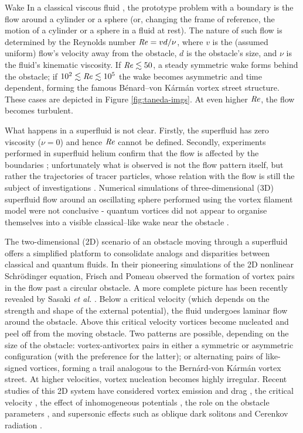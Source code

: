 \begin{chapter}{\label{cha:wake}Wake}
In a classical viscous fluid \cite{Frisch}, the prototype problem with
a boundary is the flow 
around a cylinder or a sphere (or, changing the frame of reference, 
the motion of a cylinder or a sphere in a fluid at rest).
The nature of such flow is determined by the Reynolds 
number $\mbox{\ensuremath{\mathit{Re}}} = vd/\nu$, where $v$ is the (assumed uniform)
flow's velocity away from the obstacle, $d$ is the obstacle's size,
and $\nu$ is the fluid's
kinematic viscosity. If $\mbox{\ensuremath{\mathit{Re}}}\lesssim50$, a steady symmetric 
wake forms behind the obstacle; if $10^2\lesssim\mbox{\ensuremath{\mathit{Re}}}\lesssim10^5$ the wake 
becomes asymmetric and time dependent, forming the famous 
B\'enard--von K\'arm\'an vortex street structure.  These cases are depicted in Figure \ref{fig:taneda-imgs}.  At even higher $\mbox{\ensuremath{\mathit{Re}}}$,
the flow becomes turbulent. 

What happens in a superfluid is not clear. Firstly, the superfluid has
zero viscosity ($\nu=0$) and hence $\mbox{\ensuremath{\mathit{Re}}}$ cannot be defined. Secondly,
experiments performed in superfluid helium confirm that the flow is affected
by the boundaries \cite{VanSciver1999,VanSciver2005}; unfortunately 
what is observed is not the flow pattern itself, but rather the
trajectories of tracer particles, whose
relation with the flow is still the subject
of investigations \cite{sergeev09}. Numerical simulations of three-dimensional (3D) superfluid flow around
an oscillating sphere performed using the vortex filament model
were not conclusive - 
quantum vortices did not appear to organise themselves
into a visible classical--like wake near the obstacle \cite{Hanninen,Fujiyama,goto08}.

The two-dimensional (2D) scenario of an obstacle moving through a superfluid offers a simplified platform to consolidate analogs and disparities between classical and quantum fluids.  In their pioneering simulations of the 2D nonlinear Schr\"odinger equation, Frisch and Pomeau \cite{frisch92} observed the formation of vortex pairs in the flow past a circular obstacle.  A more complete picture has been recently revealed by Sasaki {\it et al.} \cite{saito10}. Below a critical velocity (which depends on the strength \cite{jma00} and shape of the external potential), the fluid undergoes laminar flow around the obstacle.  Above this critical velocity vortices become nucleated and peel off from the moving obstacle. Two patterns are possible, depending on the size of the obstacle: vortex-antivortex pairs in either a symmetric \cite{frisch92} or asymmetric configuration (with the preference for the latter); or alternating pairs of like-signed vortices, forming a trail analogous to the Bern\'ard-von K\'arm\'an vortex street.  At higher velocities, vortex nucleation becomes highly irregular.  Recent studies of this 2D system have considered vortex emission and drag \cite{nore93,jma99,win00,huepe00}, the critical velocity \cite{zwerger00,crescimanno00,berloff2000,rica2001,pham2004}, the effect of inhomogeneous potentials \cite{win00,jackson98,fujimoto11}, the role on the obstacle parameters \cite{huepe00,aioi11}, and supersonic effects such as oblique dark solitons \cite{el06} and Cerenkov radiation \cite{carusotto06}.


\end{chapter}
